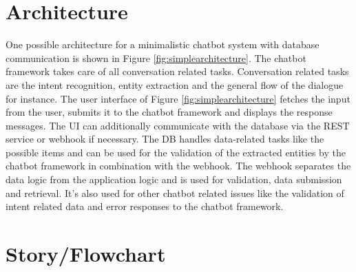 \section{Architecture}

One possible architecture for a minimalistic chatbot system with database communication is shown in Figure \ref{fig:simplearchitecture}.
The chatbot framework takes care of all conversation related tasks. 
Conversation related tasks are the intent recognition, entity extraction and the general flow of the dialogue for instance. 
The user interface of Figure \ref{fig:simplearchitecture} fetches the input from the user, submits it to the chatbot framework 
and displays the response messages. 
The UI can additionally communicate with the database via the REST service or webhook if necessary.
The DB handles data-related tasks like the possible items and can be used for the validation of the extracted entities
 by the chatbot framework in combination with the webhook. 
 The webhook separates the data logic from the application logic and is used for validation, 
 data submission and retrieval.
 It's also used for other chatbot related issues like the validation of intent related data and error responses to the chatbot framework.

 \section{Story/Flowchart}
 
